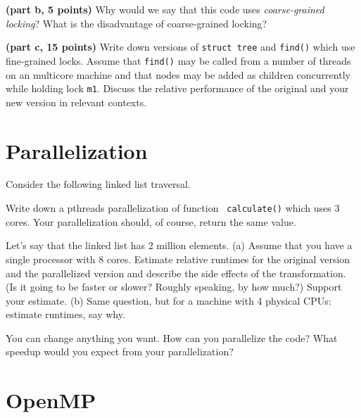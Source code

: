 \documentclass[12pt]{article}
\begin{document}
\vspace*{1em} \noindent
{\bf (part b, 5 points)} Why would we say that this code uses
\emph{coarse-grained locking}? What is the disadvantage of
coarse-grained locking?

\vspace*{1em} \noindent
{\bf (part c, 15 points)} Write down versions of {\tt struct tree} and {\tt find()} which use
fine-grained locks. Assume that {\tt find()} may be called from a number of
threads on an multicore machine and that nodes may be added as children concurrently while holding lock {\tt m1}. Discuss the relative performance of the
original and your new version in relevant contexts.


\section{Parallelization}
\label{sec:par}

Consider the following linked list traversal. 



\vspace*{1em}  Write down a pthreads parallelization of function {\tt
  calculate()} which uses 3 cores. Your parallelization should, of course, return the
same value.

\vspace*{1em}  Let's say that the linked list has
2 million elements. (a) Assume that you have a single processor with 8
cores. Estimate relative runtimes for the original version and the
parallelized version and describe the side effects of the
transformation. (Is it going to be faster or slower? Roughly speaking,
by how much?) Support your estimate.  (b) Same question, but for a
machine with 4 physical CPUs: estimate runtimes, say why.

%

\vspace*{1em}  You can change anything you want.
How can you parallelize the code? What speedup would you expect
from your parallelization?


\newpage
\section{OpenMP}
\end{document}
